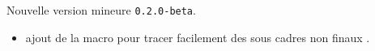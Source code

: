 Nouvelle version mineure \verb+0.2.0-beta+.

\begin{itemize}[itemsep=.5em]
    \item {}
          ajout de la macro  pour tracer facilement des sous cadres non \og finaux \fg.

    \separation
\end{itemize}
